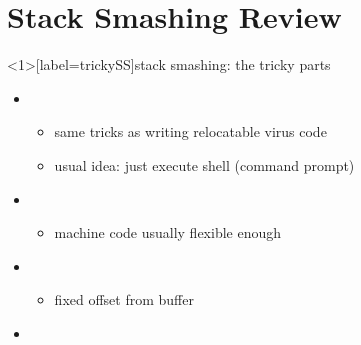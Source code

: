 \section{Stack Smashing Review}
\begin{frame}<1>[label=trickySS]{stack smashing: the tricky parts}
    \begin{itemize}
    \item {}
        \begin{itemize}
        \item same tricks as writing relocatable virus code
        \item usual idea: just execute shell (command prompt)
        \end{itemize}
    \item {}
        \begin{itemize}
        \item machine code usually flexible enough
        \end{itemize}
    \item {}
        \begin{itemize}
        \item fixed offset from buffer
        \end{itemize}
    \item {}
    \end{itemize}
\end{frame}

